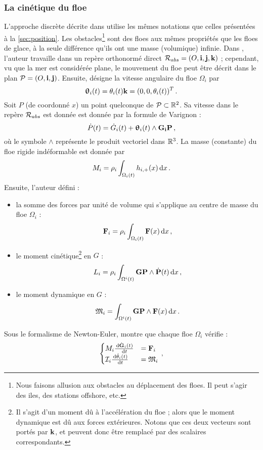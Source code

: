 \subsubsection{La cinétique du floe}

L'approche discrète décrite dans \parencite{rabatel2015thesis} utilise les mêmes notations que celles présentées à la \cref{sec:position}. Les obstacles\footnote{Nous faisons allusion aux obstacles au déplacement des floes. Il peut s'agir des iles, des stations offshore, etc.} sont des floes aux mêmes propriétés que les floes de glace, à la seule différence qu'ils ont une masse (volumique) infinie. Dans \parencite{rabatel2015thesis}, l'auteur travaille dans un repère orthonormé direct $\mathcal{R}_{abs} = (O, \bm{\mathrm{i}}, \bm{\mathrm{j}}, \bm{\mathrm{k}})$ ; cependant, vu que la mer est considérée plane, le mouvement du floe peut être décrit dans le plan $\mathcal{P} = (O, \bm{\mathrm{i}}, \bm{\mathrm{j}})$. Ensuite, \citeauthor{rabatel2015thesis} désigne la vitesse angulaire du floe $\Omega_i$ par 
$$
\bm{\mathrm{\uptheta}}_i(t) = \theta_i(t)\bm{\mathrm{k}} = (0,0,\theta_i(t))^T \,.
$$
Soit $P$ (de coordonné $x$) un point quelconque de $\mathcal{P} \subset \mathbb{R}^2$. Sa vitesse dans le repère $\mathcal{R}_{abs}$ est donnée est donnée par la formule de Varignon :
$$
\dot{P}(t) = \dot{G}_i(t) + \bm{\uptheta}_i(t) \wedge \bm{\mathrm{G_iP}} \,,
$$
où le symbole $\wedge$ représente le produit vectoriel dans $\mathbb{R}^3$. La masse (constante) du floe rigide indéformable est donnée par 
$$
M_i = \rho_i \int_{\Omega_i(t)} h_{i, +} (x) \diff x \,.
$$
Ensuite, l'auteur défini :
\begin{itemize}
    \item la somme des forces par unité de volume qui s'applique au centre de masse du floe $\Omega_i$ : $$\bvec{F}_i = \rho_i \int_{\Omega_i(t)} \bvec{F}(x) \diff x \,,$$
    \item le moment cinétique\footnote{Il s'agit d'un moment dû à l'accélération du floe ; alors que le moment dynamique est dû aux forces extérieures. Notons que ces deux vecteurs sont portés par $\bm{\mathrm{k}}$, et peuvent donc être remplacé par des scalaires correspondants.} en $G$ : $$L_i = \rho_i \intO{i} \bvec{GP} \wedge \dot{\bvec{P}}(t) \diff x \,,$$
    \item le moment dynamique en $G$ : $$\mathfrak{M}_i = \intO{i} \bvec{GP} \wedge \bvec{F}(x) \diff x \,.$$
\end{itemize}
Sous le formalisme de Newton-Euler, \citeauthor{rabatel2015thesis} montre que chaque floe $\Omega_i$ vérifie :
$$
    \begin{cases}
        M_i \frac{\diff \dot{\bvec{G}}_i(t)}{\diff t} &= \bvec{F}_i \\
        \mathcal{I}_i \frac{\diff \dot{\theta}_i(t)}{\diff t} &= \mathfrak{M}_i
    \end{cases} \,,
$$
